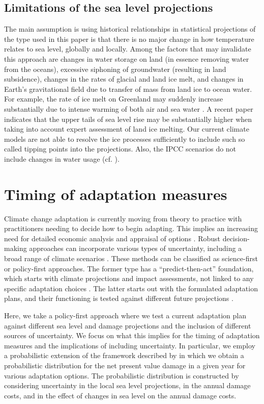 \documentclass[note,screen,british,11pt]{nrdoc}
\begin{document}
\subsection{Limitations of the sea level projections}
The main assumption is using historical relationships in statistical projections of the type used in this paper is that there is no major change in how temperature relates to sea level, globally and locally. Among the factors that may invalidate this approach are changes in water storage on land (in essence removing water from the oceans), excessive siphoning of groundwater (resulting in land subsidence), changes in the rates of glacial and land ice melt, and changes in Earth's gravitational field due to transfer of mass from land ice to ocean water. For example, the rate of ice melt on Greenland may suddenly increase substantially due to intense warming of both air and sea water \citep{bamber2013}. A recent paper \citep{jevrejeva2016} indicates that the upper tails of sea level rise may be substantially higher when taking into account expert assessment of land ice melting. Our current climate models are not able to resolve the ice processes sufficiently to include such so called tipping points into the projections. Also, the IPCC scenarios \citep{change} do not include changes in water usage (cf. \citet{wada2012}). 

\section{Timing of adaptation measures}
\label{decision_tools_PartI}

Climate change adaptation is currently moving from theory to practice with practitioners needing to decide how to begin adapting. This implies an increasing need for detailed economic analysis and appraisal of options   \citep{Downing2012}. Robust decision-making approaches can incorporate various types of uncertainty, including a broad range of climate scenarios \citep{Dittrich&2016}. These methods can be classified as science-first or policy-first approaches. The former type has a ``predict-then-act'' foundation, which starts with climate projections and impact assessments, not linked to any specific adaptation choices \citep{Jones&2014}. The latter starts out with the formulated adaptation plans, and their functioning is tested against different future projections \citep{Dittrich&2016}.

Here, we take a policy-first approach where we test a current adaptation plan against different sea level and damage projections and the inclusion of different sources of uncertainty. We focus on what this implies for the timing of adaptation measures and the implications of including uncertainty. In particular, we employ a probabilistic extension of the framework described by \citep{Fankhauser&1999} in which we obtain a probabilistic distribution for the net present value damage in a given year for various adaptation options. The probabilistic distribution is constructed by considering uncertainty in the local sea level projections, in the annual damage costs, and in the effect of changes in sea level on the annual damage costs. 
\end{document}

